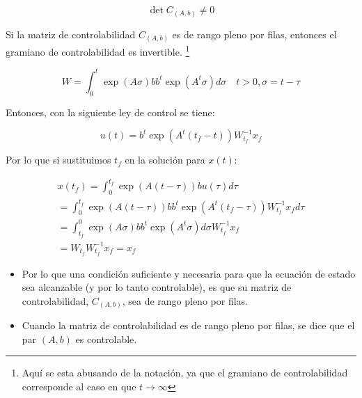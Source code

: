         \begin{equation}
            \det{C_{(A,b)}} \ne 0
        \end{equation}

        Si la matriz de controlabilidad $C_{(A,b)}$ es de rango pleno por filas, entonces el gramiano de controlabilidad es invertible. \footnote{Aquí se esta abusando de la notación, ya que el gramiano de controlabilidad corresponde al caso en que $t \to \infty$}

        \begin{equation}
            W = \int_0^t \exp{(A \sigma)} b b^t \exp{(A^t \sigma)} d\sigma \quad t > 0, \sigma = t - \tau
        \end{equation}

        Entonces, con la siguiente ley de control se tiene:

        \begin{equation}
            u(t) = b^t \exp{(A^t(t_f - t))} W_{t_f}^{-1} x_f
        \end{equation}

        Por lo que si sustituimos $t_f$ en la solución para $x(t)$:

        \begin{multline}
            x(t_f) = \int_0^{t_f} \exp{(A(t - \tau))} b u(\tau) d\tau \\
                   = \int_0^{t_f} \exp{(A(t - \tau))} b b^t \exp{(A^t(t_f - \tau))} W_{t_f}^{-1} x_f d\tau \\
                   = \int_{t_f}^0 \exp{(A \sigma)} b b^t \exp{(A^t \sigma)} d\sigma W_{t_f}^{-1} x_f \\
                   = W_{t_f} W_{t_f}^{-1} x_f = x_f
        \end{multline}

        \begin{itemize}
            \item Por lo que una condición suficiente y necesaria para que la ecuación de estado sea alcanzable (y por lo tanto controlable), es que su matriz de controlabilidad, $C_{(A,b)}$, sea de rango pleno por filas.
            \item Cuando la matriz de controlabilidad es de rango pleno por filas, se dice que el par $(A, b)$ es controlable.
        \end{itemize}


